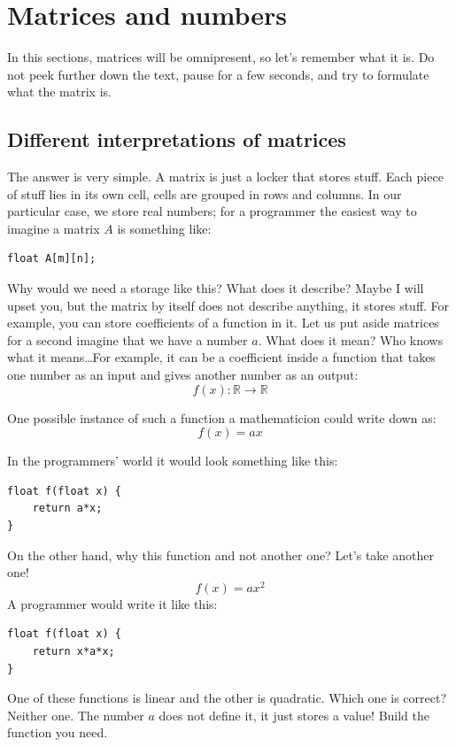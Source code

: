 \documentclass[notitlepage]{report}
\begin{document}
\section{Matrices and numbers}
In this sections, matrices will be omnipresent, so let's remember what it is.
Do not peek further down the text, pause for a few seconds, and try to formulate what the matrix is.

\subsection{Different interpretations of matrices}

The answer is very simple. A matrix is just a locker that stores stuff.
Each piece of stuff lies in its own cell, cells are grouped in rows and columns.
In our particular case, we store real numbers; for a programmer the easiest way to imagine a matrix $A$ is something like:
\begin{verbatim}
float A[m][n];
\end{verbatim}

Why would we need a storage like this? What does it describe?
Maybe I will upset you, but the matrix by itself does not describe anything, it stores stuff.
For example, you can store coefficients of a function in it.
Let us put aside matrices for a second imagine that we have a number $a$. What does it mean?
Who knows what it means\dots For example, it can be a coefficient inside a function that takes one number as an input and gives another number as an output:
$$
f(x) : \mathbb R \rightarrow \mathbb R
$$

One possible instance of such a function a mathematicion could write down as:
$$
f(x) = ax
$$

In the programmers' world it would look something like this:
\begin{verbatim}
float f(float x) {
    return a*x;
}
\end{verbatim}

On the other hand, why this function and not another one? Let's take another one!
$$
f(x) = ax^2
$$
A programmer would write it like this:
\begin{verbatim}
float f(float x) {
    return x*a*x;
}
\end{verbatim}

One of these functions is linear and the other is quadratic. Which one is correct? 
Neither one. The number $a$ does not define it, it just stores a value! 
Build the function you need.
\end{document}
